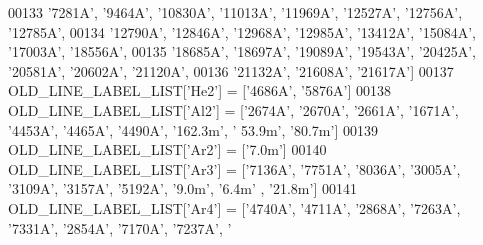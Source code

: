 \begin{DoxyCode}
{{00133                           \textcolor{stringliteral}{'7281A'}, \textcolor{stringliteral}{'9464A'}, \textcolor{stringliteral}{'10830A'}, \textcolor{stringliteral}{'11013A'}, \textcolor{stringliteral}{'11969A'}, \textcolor{stringliteral}{'12527A'}, \textcolor{stringliteral}{'12756A'}, \textcolor{stringliteral}{'12785A'},
00134                           \textcolor{stringliteral}{'12790A'}, \textcolor{stringliteral}{'12846A'}, \textcolor{stringliteral}{'12968A'}, \textcolor{stringliteral}{'12985A'}, \textcolor{stringliteral}{'13412A'}, \textcolor{stringliteral}{'15084A'}, \textcolor{stringliteral}{'17003A'}, \textcolor{stringliteral}{'18556A'},
00135                           \textcolor{stringliteral}{'18685A'}, \textcolor{stringliteral}{'18697A'}, \textcolor{stringliteral}{'19089A'}, \textcolor{stringliteral}{'19543A'}, \textcolor{stringliteral}{'20425A'}, \textcolor{stringliteral}{'20581A'}, \textcolor{stringliteral}{'20602A'}, \textcolor{stringliteral}{'21120A'},
00136                           \textcolor{stringliteral}{'21132A'}, \textcolor{stringliteral}{'21608A'}, \textcolor{stringliteral}{'21617A'}]
00137 OLD\_LINE\_LABEL\_LIST[\textcolor{stringliteral}{'He2'}] = [\textcolor{stringliteral}{'4686A'}, \textcolor{stringliteral}{'5876A'}]
00138 OLD\_LINE\_LABEL\_LIST[\textcolor{stringliteral}{'Al2'}] = [\textcolor{stringliteral}{'2674A'}, \textcolor{stringliteral}{'2670A'}, \textcolor{stringliteral}{'2661A'}, \textcolor{stringliteral}{'1671A'}, \textcolor{stringliteral}{'4453A'}, \textcolor{stringliteral}{'4465A'}, \textcolor{stringliteral}{'4490A'}, \textcolor{stringliteral}{'162.3m'}, \textcolor{stringliteral}{'
      53.9m'}, \textcolor{stringliteral}{'80.7m'}]
00139 OLD\_LINE\_LABEL\_LIST[\textcolor{stringliteral}{'Ar2'}] = [\textcolor{stringliteral}{'7.0m'}]
00140 OLD\_LINE\_LABEL\_LIST[\textcolor{stringliteral}{'Ar3'}] = [\textcolor{stringliteral}{'7136A'}, \textcolor{stringliteral}{'7751A'}, \textcolor{stringliteral}{'8036A'}, \textcolor{stringliteral}{'3005A'}, \textcolor{stringliteral}{'3109A'}, \textcolor{stringliteral}{'3157A'}, \textcolor{stringliteral}{'5192A'}, \textcolor{stringliteral}{'9.0m'}, \textcolor{stringliteral}{'6.4m'}
      , \textcolor{stringliteral}{'21.8m'}]
00141 OLD\_LINE\_LABEL\_LIST[\textcolor{stringliteral}{'Ar4'}] = [\textcolor{stringliteral}{'4740A'}, \textcolor{stringliteral}{'4711A'}, \textcolor{stringliteral}{'2868A'}, \textcolor{stringliteral}{'7263A'}, \textcolor{stringliteral}{'7331A'}, \textcolor{stringliteral}{'2854A'}, \textcolor{stringliteral}{'7170A'}, \textcolor{stringliteral}{'7237A'}, \textcolor{stringliteral}{'
}}}
\end{DoxyCode}
